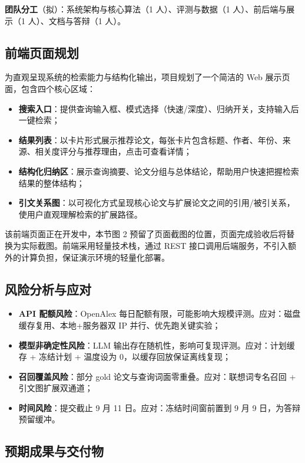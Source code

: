 \documentclass[11pt,a4paper,fontset=macnew]{ctexart}
\begin{document}
\noindent\textbf{团队分工}（拟）：系统架构与核心算法（1 人）、评测与数据（1 人）、前后端与展示（1 人）、文档与答辩（1 人）。

\subsection{前端页面规划}
\label{sec:frontend}

为直观呈现系统的检索能力与结构化输出，项目规划了一个简洁的 Web 展示页面，包含四个核心区域：

\begin{itemize}
  \item \textbf{搜索入口}：提供查询输入框、模式选择（快速/深度）、归纳开关，支持输入后一键检索；
  \item \textbf{结果列表}：以卡片形式展示推荐论文，每张卡片包含标题、作者、年份、来源、相关度评分与推荐理由，点击可查看详情；
  \item \textbf{结构化归纳区}：展示查询摘要、论文分组与总体结论，帮助用户快速把握检索结果的整体结构；
  \item \textbf{引文关系图}：以可视化方式呈现核心论文与扩展论文之间的引用/被引关系，使用户直观理解检索的扩展路径。
\end{itemize}

该前端页面正在开发中，本节图 2 预留了页面截图的位置，页面完成验收后将替换为实际截图。前端采用轻量技术栈，通过 REST 接口调用后端服务，不引入额外的计算负担，保证演示环境的轻量化部署。

\subsection{风险分析与应对}
\label{sec:risk}

\begin{itemize}
  \item \textbf{API 配额风险}：OpenAlex 每日配额有限，可能影响大规模评测。应对：磁盘缓存复用、本地+服务器双 IP 并行、优先跑关键实验；
  \item \textbf{模型非确定性风险}：LLM 输出存在随机性，影响可复现评测。应对：计划缓存 + 冻结计划 + 温度设为 0，以缓存回放保证离线复现；
  \item \textbf{召回覆盖风险}：部分 gold 论文与查询词面零重叠。应对：联想词专名召回 + 引文图扩展双通道；
  \item \textbf{时间风险}：提交截止 9 月 11 日。应对：冻结时间窗前置到 9 月 9 日，为答辩预留缓冲。
\end{itemize}

\subsection{预期成果与交付物}
\label{sec:deliverables}
\end{document}

